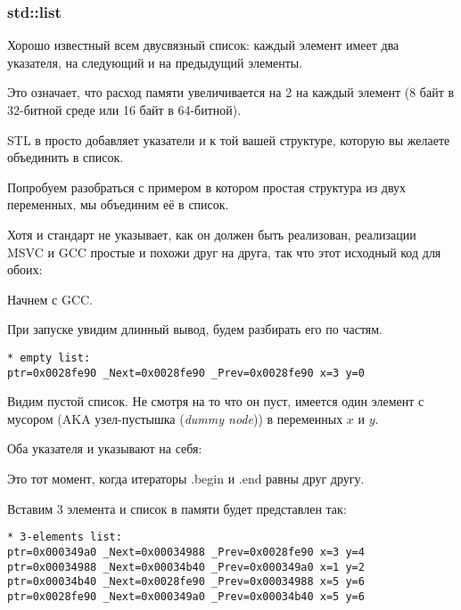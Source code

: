 \subsubsection{std::list}
\label{std_list}

Хорошо известный всем двусвязный список: каждый элемент имеет два указателя, на следующий и на предыдущий
элементы.

Это означает, что расход памяти увеличивается на 2  на каждый элемент (8 байт в 32-битной среде или
16 байт в 64-битной).

STL в \Cpp просто добавляет указатели  и  к той вашей структуре, которую вы желаете объединить в список.

Попробуем разобраться с примером в котором простая структура из двух переменных, мы объединим её в список.

Хотя и стандарт \Cpp не указывает, как он должен быть реализован, реализации
MSVC и GCC простые и похожи друг на друга, так что этот исходный код для обоих:




Начнем с GCC.

При запуске увидим длинный вывод, будем разбирать его по частям.

\begin{lstlisting}
* empty list:
ptr=0x0028fe90 _Next=0x0028fe90 _Prev=0x0028fe90 x=3 y=0
\end{lstlisting}

Видим пустой список.
Не смотря на то что он пуст, имеется один элемент с мусором (\ac{AKA} узел-пустышка (\emph{dummy node})) 
в переменных $x$ и $y$.

Оба указателя  и  указывают на себя:



Это тот момент, когда итераторы .begin и .end равны друг другу.

Вставим 3 элемента и список в памяти будет представлен так:

\begin{lstlisting}
* 3-elements list:
ptr=0x000349a0 _Next=0x00034988 _Prev=0x0028fe90 x=3 y=4
ptr=0x00034988 _Next=0x00034b40 _Prev=0x000349a0 x=1 y=2
ptr=0x00034b40 _Next=0x0028fe90 _Prev=0x00034988 x=5 y=6
ptr=0x0028fe90 _Next=0x000349a0 _Prev=0x00034b40 x=5 y=6
\end{lstlisting}

